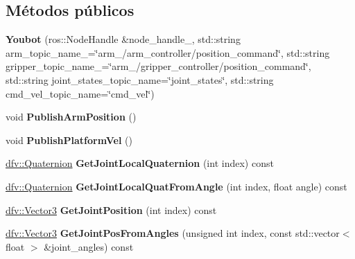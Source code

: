 \subsection*{\-Métodos públicos}
\begin{DoxyCompactItemize}
\item 
\hypertarget{classdfv_1_1Youbot_a7bef60e35a117942f345b07f19a09e1b}{{\bfseries \-Youbot} (ros\-::\-Node\-Handle \&node\-\_\-handle\-\_\-, std\-::string arm\-\_\-topic\-\_\-name\-\_\-=\char`\"{}arm\-\_/arm\-\_\-controller/position\-\_\-command\char`\"{}, std\-::string gripper\-\_\-topic\-\_\-name\-\_\-=\char`\"{}arm\-\_/gripper\-\_\-controller/position\-\_\-command\char`\"{}, std\-::string joint\-\_\-states\-\_\-topic\-\_\-name=\char`\"{}joint\-\_\-states\char`\"{}, std\-::string cmd\-\_\-vel\-\_\-topic\-\_\-name=\char`\"{}cmd\-\_\-vel\char`\"{})}\label{classdfv_1_1Youbot_a7bef60e35a117942f345b07f19a09e1b}

\item 
\hypertarget{classdfv_1_1Youbot_a9aefad604da0d465dadaf4ab923a089c}{void {\bfseries \-Publish\-Arm\-Position} ()}\label{classdfv_1_1Youbot_a9aefad604da0d465dadaf4ab923a089c}

\item 
\hypertarget{classdfv_1_1Youbot_a72ecbf08b87d31f35384d2712d5273ae}{void {\bfseries \-Publish\-Platform\-Vel} ()}\label{classdfv_1_1Youbot_a72ecbf08b87d31f35384d2712d5273ae}

\item 
\hypertarget{classdfv_1_1Youbot_aff3bcde6d3e88c59451004471e37b4ca}{\hyperlink{classdfv_1_1Quaternion}{dfv\-::\-Quaternion} {\bfseries \-Get\-Joint\-Local\-Quaternion} (int index) const }\label{classdfv_1_1Youbot_aff3bcde6d3e88c59451004471e37b4ca}

\item 
\hypertarget{classdfv_1_1Youbot_aa296d0281fc1c9c00ebea6cd1367c9ea}{\hyperlink{classdfv_1_1Quaternion}{dfv\-::\-Quaternion} {\bfseries \-Get\-Joint\-Local\-Quat\-From\-Angle} (int index, float angle) const }\label{classdfv_1_1Youbot_aa296d0281fc1c9c00ebea6cd1367c9ea}

\item 
\hypertarget{classdfv_1_1Youbot_ad36241fa6b5c2bed6166a9102c709be1}{\hyperlink{classdfv_1_1Vector3}{dfv\-::\-Vector3} {\bfseries \-Get\-Joint\-Position} (int index) const }\label{classdfv_1_1Youbot_ad36241fa6b5c2bed6166a9102c709be1}

\item 
\hypertarget{classdfv_1_1Youbot_a8cd5e38e039cc50fe0f93a9344d727e4}{\hyperlink{classdfv_1_1Vector3}{dfv\-::\-Vector3} {\bfseries \-Get\-Joint\-Pos\-From\-Angles} (unsigned int index, const std\-::vector$<$ float $>$ \&joint\-\_\-angles) const }\label{classdfv_1_1Youbot_a8cd5e38e039cc50fe0f93a9344d727e4}


\end{DoxyCompactItemize}
